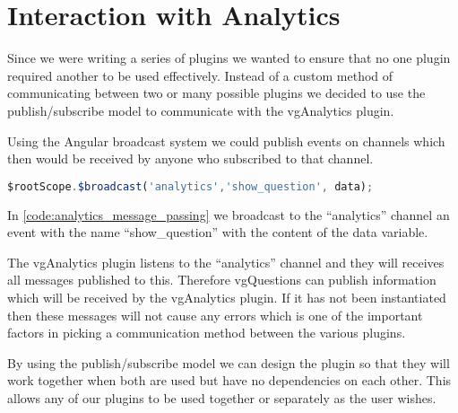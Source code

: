 \section{Interaction with Analytics}
\label{Section:vgQuestions Analytics}


Since we were writing a series of plugins we wanted to ensure that no one
plugin required another to be used effectively. Instead of a custom method of
communicating between two or many possible plugins we decided to use the
publish/subscribe model to communicate with the vgAnalytics plugin.

Using the Angular broadcast system we could publish events on channels which
then would be received by anyone who subscribed to that channel.

\begin{lstlisting}[language=javascript,caption={\label{code:analytics_message_passing} AngularJS demonstrating the message passing interface used in the Analytics plugin}]
$rootScope.$broadcast('analytics','show_question', data);
\end{lstlisting}

In \autoref{code:analytics_message_passing} we broadcast to the ``analytics'' channel an event with the name
``show\_question'' with the content of the data variable.

The vgAnalytics plugin listens to the ``analytics'' channel and they will
receives all messages published to this. Therefore vgQuestions can publish
information which will be received by the vgAnalytics plugin. If it has not
been instantiated then these messages will not cause any errors which is one of
the important factors in picking a communication method between the various
plugins.

By using the publish/subscribe model we can design the plugin so that they will work together when both are used but have no dependencies on each other. This allows any of our plugins to be used together or separately as the
user wishes.
